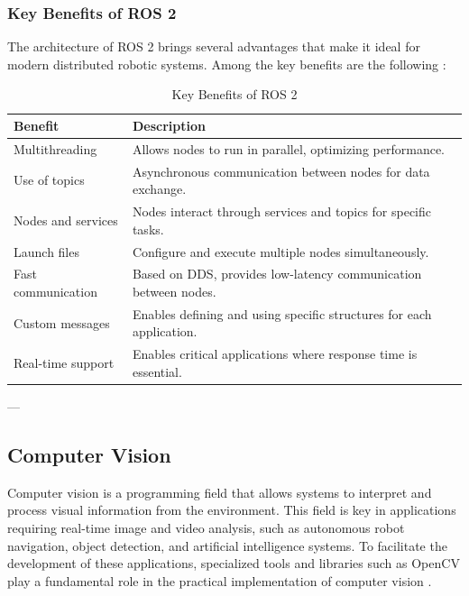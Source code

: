     \subsubsection{Key Benefits of ROS 2}
    
    The architecture of ROS 2 brings several advantages that make it ideal for modern distributed robotic systems. Among the key benefits are the following \cite{ros_docs}:  
    
    \begin{table}[H]
    \centering
    \caption{Key Benefits of ROS 2}
    \begin{tabular}{|l|p{10cm}|}
    \hline
    \textbf{Benefit} & \textbf{Description} \\
    \hline
    Multithreading & Allows nodes to run in parallel, optimizing performance. \\
    \hline
    Use of topics & Asynchronous communication between nodes for data exchange. \\
    \hline
    Nodes and services & Nodes interact through services and topics for specific tasks. \\
    \hline
    Launch files & Configure and execute multiple nodes simultaneously. \\
    \hline
    Fast communication & Based on DDS, provides low-latency communication between nodes. \\
    \hline
    Custom messages & Enables defining and using specific structures for each application. \\
    \hline
    Real-time support & Enables critical applications where response time is essential. \\
    \hline
    \end{tabular}
    \label{table:benefits}
    \end{table}    

---

\subsection{Computer Vision}

    Computer vision is a programming field that allows systems to interpret and process visual information from the environment. This field is key in applications requiring real-time image and video analysis, such as autonomous robot navigation, object detection, and artificial intelligence systems. To facilitate the development of these applications, specialized tools and libraries such as OpenCV play a fundamental role in the practical implementation of computer vision \cite{opencv_docs}.  
    

